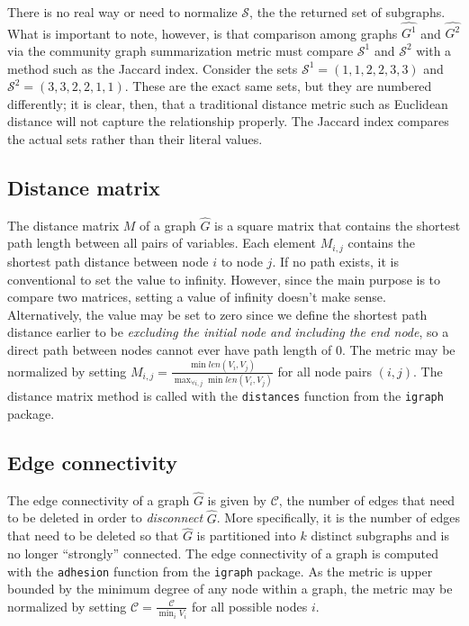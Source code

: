 There is no real way or need to normalize $\mathcal{S}$, the the returned set 
of subgraphs. What is important to note, however, is that comparison among 
graphs $\hat{G^1}$ and $\hat{G^2}$ via the community graph summarization metric 
must compare $\mathcal{S}^1$ and $\mathcal{S}^2$ with a method such as the 
Jaccard index. Consider the sets $\mathcal{S}^1=(1,1,2,2,3,3)$ and 
$\mathcal{S}^2=(3,3,2,2,1,1)$. These are 
the exact same sets, but they are numbered differently; it is clear, then, that 
a traditional distance metric such as Euclidean distance will not capture the 
relationship properly. The Jaccard index compares the actual sets rather than 
their literal values.

\subsection{Distance matrix}

The distance matrix $M$ of a graph $\hat{G}$ is a square matrix that 
contains the shortest path length 
between all pairs of variables. Each element $M_{i,j}$ 
contains the shortest path distance between node $i$ to node $j$. If no path 
exists, it is conventional to set the value to infinity. However, since the 
main purpose is to compare two matrices, 
setting a value of infinity doesn't make sense. Alternatively, the value may be 
set to zero since we define the shortest path distance earlier to be 
\textit{excluding the initial node and including the end node}, so a direct 
path between nodes cannot ever have path length of 0. The metric may be 
normalized by setting $M_{i,j} = \frac{\min len(V_i,V_j)}{\max_{\forall i,j} 
\min len(V_i,V_j)}$ for all node pairs $(i,j)$.
The distance matrix method is called with the \texttt{distances} function from 
the \texttt{igraph} package.

\subsection{Edge connectivity}

The edge connectivity of a graph $\hat{G}$ is given by $\mathcal{C}$, the 
number of edges that need to be deleted in order to \textit{disconnect} 
$\hat{G}$. More specifically, it is the number of edges that need to be 
deleted so that $\hat{G}$ is partitioned into $k$ distinct subgraphs and is
no longer ``strongly'' connected. The edge connectivity of a graph is computed 
with the \texttt{adhesion} function from the \texttt{igraph} package. As the 
metric is upper bounded by the minimum degree of any node within a graph, the 
metric may be normalized by setting $\mathcal{C} = \frac{\mathcal{C}}{\min_i 
V_i}$ for all possible nodes $i$.

